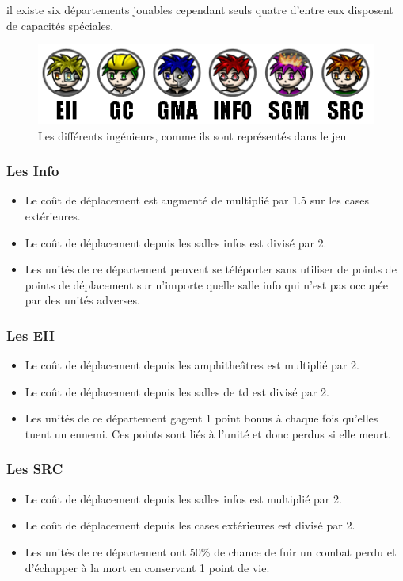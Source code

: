 il existe six départements jouables cependant seuls quatre d'entre eux disposent de capacités spéciales. 

\begin{figure}[!h]
\centering
\includegraphics[width=.7\textwidth]{Parties/Images/Unites.png}
\caption{Les différents ingénieurs, comme ils sont représentés dans le jeu}
\label{fig:Unites}
\end{figure}

\subsubsection{Les Info}
\begin{itemize}
\item Le coût de déplacement est augmenté de multiplié par 1.5 sur les cases extérieures.
\item Le coût de déplacement depuis les salles infos est divisé par 2.
\item Les unités de ce département peuvent se téléporter sans utiliser de points de points de déplacement sur n'importe quelle salle info qui n'est pas occupée par des unités adverses.
\end{itemize}

\subsubsection{Les EII}
\begin{itemize}
\item Le coût de déplacement depuis les amphitheâtres est multiplié par 2.
\item Le coût de déplacement depuis les salles de td est divisé par 2.
\item Les unités de ce département gagent 1 point bonus à chaque fois qu'elles tuent un ennemi. Ces points sont liés à l'unité et donc perdus si elle meurt.
\end{itemize} 

\subsubsection{Les SRC}
\begin{itemize}
\item Le coût de déplacement depuis les salles infos est multiplié par 2.
\item Le coût de déplacement depuis les cases extérieures est divisé par 2.
\item Les unités de ce département ont 50\% de chance de fuir un combat perdu et d'échapper à la mort en conservant 1 point de vie. 
\end{itemize}

